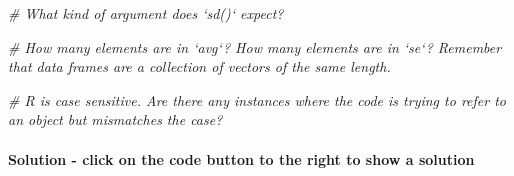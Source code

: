 \documentclass[
]{article}
\newenvironment{Shaded}{\begin{snugshade}}{\end{snugshade}}
\newcommand{\CommentTok}[1]{\textcolor[rgb]{0.56,0.35,0.01}{\textit{#1}}}
\newcommand{\DataTypeTok}[1]{\textcolor[rgb]{0.13,0.29,0.53}{#1}}
\newcommand{\DecValTok}[1]{\textcolor[rgb]{0.00,0.00,0.81}{#1}}
\newcommand{\KeywordTok}[1]{\textcolor[rgb]{0.13,0.29,0.53}{\textbf{#1}}}
\newcommand{\NormalTok}[1]{#1}
\newcommand{\OperatorTok}[1]{\textcolor[rgb]{0.81,0.36,0.00}{\textbf{#1}}}
\newcommand{\StringTok}[1]{\textcolor[rgb]{0.31,0.60,0.02}{#1}}
\begin{document}
\begin{Shaded}
\begin{Highlighting}[]
\CommentTok{# What kind of argument does `sd()` expect?}
\end{Highlighting}
\end{Shaded}

\begin{Shaded}
\begin{Highlighting}[]
\CommentTok{# How many elements are in `avg`? How many elements are in `se`? Remember that data frames are a collection of vectors of the same length.}
\end{Highlighting}
\end{Shaded}

\begin{Shaded}
\begin{Highlighting}[]
\CommentTok{# R is case sensitive. Are there any instances where the code is trying to refer to an object but mismatches the case?}
\end{Highlighting}
\end{Shaded}

\hypertarget{solution---click-on-the-code-button-to-the-right-to-show-a-solution-2}{%
\paragraph{Solution - click on the code button to the right to show a
solution}\label{solution---click-on-the-code-button-to-the-right-to-show-a-solution-2}}

\begin{Shaded}
\end{Shaded}
\end{document}
